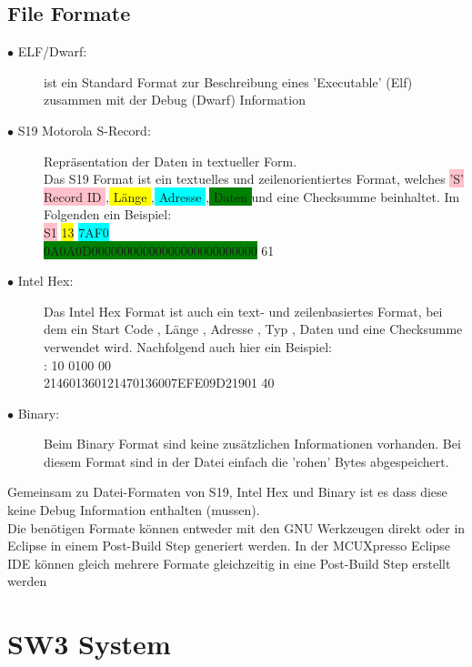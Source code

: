 \documentclass[a4paper, 8pt]{extarticle}
\begin{document}
\begin{multicols*}{3}
			\subsection{File Formate}
				\begin{description}
					\item[$\bullet$ ELF/Dwarf:] ist ein Standard Format zur Beschreibung eines ’Executable’
					(Elf) zusammen mit der Debug (Dwarf) Information
					\item[$\bullet$ S19 Motorola S-Record:] Repräsentation der Daten in textueller Form.\\
					Das S19 Format ist ein textuelles und zeilenorientiertes Format, welches
					\colorbox{pink}{’S’ Record ID },\colorbox{yellow}{ Länge },\colorbox{cyan}{ Adresse },\colorbox{green}{ Daten } und eine Checksumme beinhaltet.
					Im Folgenden ein Beispiel:\\
					\colorbox{pink}{S1} \colorbox{yellow}{13} \colorbox{cyan}{7AF0}\\ \colorbox{green}{0A0A0D00000000000000000000000000} 61
					\item[$\bullet$ Intel Hex:]
					Das Intel Hex Format ist auch ein text- und zeilenbasiertes Format, bei
					dem ein Start Code , Länge , Adresse , Typ , Daten und eine Checksumme
					verwendet wird. Nachfolgend auch hier ein Beispiel:\\
					: 10 0100 00 \\214601360121470136007EFE09D21901 40
					\item[$\bullet$ Binary:] Beim Binary Format sind keine zusätzlichen Informationen vorhanden. Bei
					diesem Format sind in der Datei einfach die ’rohen’ Bytes abgespeichert.\newline 
				\end{description}	
	Gemeinsam zu Datei-Formaten von S19, Intel Hex und Binary ist es dass diese
	keine Debug Information enthalten (mussen).\\
	Die benötigen Formate können entweder mit den GNU Werkzeugen direkt
	oder in Eclipse in einem Post-Build Step generiert werden. In der MCUXpresso
	Eclipse IDE können gleich mehrere Formate gleichzeitig in eine Post-Build Step
	erstellt werden
	
		\section{SW3 System}

\end{multicols*}
\end{document}
